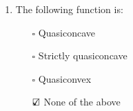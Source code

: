 \documentclass{./../../Latex/tests}
\begin{document}
\begin{enumerate}
\begin{enumerate}
\newpage
\item The following function is:
\begin{center}
\end{center}
\begin{itemize}
  \item[$\square$] Quasiconcave
  \item[$\square$] Strictly quasiconcave
  \item[$\square$] Quasiconvex
  \item[$\text{\rlap{$\checkmark$}}\square$] None of the above \\~\\
\end{itemize} 
\end{enumerate} 


\end{enumerate}
\end{document}
